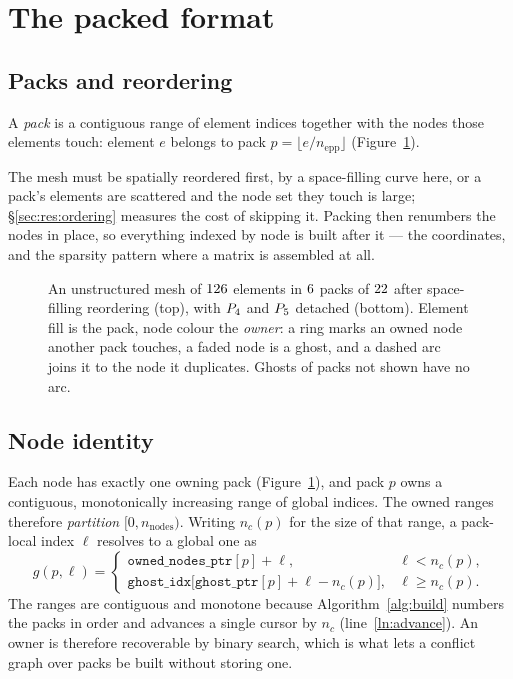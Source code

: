 \documentclass[sigconf,nonacm]{acmart}
\begin{document}
\section{The packed format}
\label{sec:format}

\subsection{Packs and reordering}

A \emph{pack} is a contiguous range of element indices together with the nodes those elements
touch: element $e$ belongs to pack $p = \lfloor e / n_{\mathrm{epp}} \rfloor$
(Figure~\ref{fig:decomposition}).

The mesh must be spatially reordered first, by a space-filling curve here, or a pack's elements
are scattered and the node set they touch is large; \S\ref{sec:res:ordering} measures the cost
of skipping it. Packing then renumbers the nodes in place, so everything indexed by node is
built after it --- the coordinates, and the sparsity pattern where a matrix is assembled at all.

\begin{figure}[t]
  \centering
  \resizebox{0.82\columnwidth}{!}{}
  \caption{An unstructured mesh of $126$ elements in $6$ packs of
    $22$ after space-filling reordering (top), with $P_4$ and
    $P_5$ detached (bottom). Element fill is the pack, node colour the
    \emph{owner}: a ring marks an owned node another pack touches, a faded node is a ghost, and
    a dashed arc joins it to the node it duplicates. Ghosts of packs not shown have no arc.}
  \label{fig:decomposition}
\end{figure}


\subsection{Node identity}
\label{sec:format:zones}

Each node has exactly one owning pack (Figure~\ref{fig:decomposition}), and pack $p$ owns a
contiguous, monotonically increasing
range of global indices. The owned ranges therefore \emph{partition} $[0, n_{\mathrm{nodes}})$.
Writing $n_c(p)$ for the size of that range, a pack-local index $\ell$ resolves to a global one
as
\[
  g(p,\ell) =
  \begin{cases}
    \texttt{owned\_nodes\_ptr}[p] + \ell, & \ell < n_c(p),\\[2pt]
    \texttt{ghost\_idx}\big[\texttt{ghost\_ptr}[p] + \ell - n_c(p)\big], & \ell \ge n_c(p).
  \end{cases}
\]
The ranges are contiguous and monotone because Algorithm~\ref{alg:build} numbers the packs in
order and advances a single cursor by $n_c$ (line~\ref{ln:advance}). An owner is therefore
recoverable by binary search, which is what lets a conflict graph over packs be built without
storing one.
\end{document}
